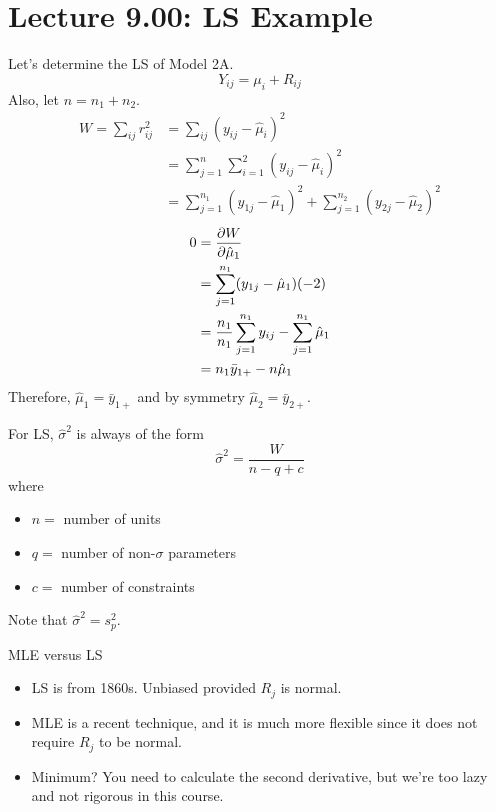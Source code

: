 \section{Lecture 9.00: LS Example}
Let's determine the LS of Model 2A.
\[ Y_{ij}=\mu_i+R_{ij} \]
Also, let $ n=n_1+n_2 $.
\begin{align*}
    W=\sum_{ij}r_{ij}^2
     & =\sum_{ij}(y_{ij}-\hat{\mu}_i)^2                                                  \\
     & =\sum_{j=1}^{n} \sum_{i=1}^{2} (y_{ij}-\hat{\mu}_i)^2                             \\
     & =\sum_{j=1}^{n_1}(y_{1j}-\hat{\mu}_1)^2 + \sum_{j=1}^{n_2} (y_{2j}-\hat{\mu}_2)^2
\end{align*}
\begin{align*}
    0 & =\pdv{W}{\hat{\mu}_1}                                                \\
      & =\sum_{j=1}^{n_1} (y_{1j}-\hat{\mu}_1)(-2)                           \\
      & =\frac{n_1}{n_1} \sum_{j=1}^{n_1} y_{ij}-\sum_{j=1}^{n_1}\hat{\mu}_1 \\
      & =n_1\bar{y}_{1+}-n\hat{\mu}_1                                        \\
\end{align*}
Therefore, $ \hat{\mu}_1=\bar{y}_{1+} $ and by symmetry $ \hat{\mu}_2=\bar{y}_{2+} $.
\begin{Remark}{}{}
    For LS, $ \hat{\sigma}^2 $ is always of the form
    \[ \hat{\sigma}^2=\frac{W}{n-q+c} \]
    where
    \begin{itemize}
        \item $ n= $ number of units
        \item $ q= $ number of non-$ \sigma $ parameters
        \item $ c= $ number of constraints
    \end{itemize}
    Note that $ \hat{\sigma}^2=s_p^2 $.
\end{Remark}
\begin{Remark}{MLE versus LS}{}
    \begin{itemize}
        \item LS is from 1860s. Unbiased provided $ R_j $ is normal.
        \item MLE is a recent technique, and it is much more flexible
              since it does not require $ R_j $ to be normal.
        \item Minimum? You need to calculate the second derivative,
              but we're too lazy and not rigorous in this course.
    \end{itemize}
\end{Remark}

